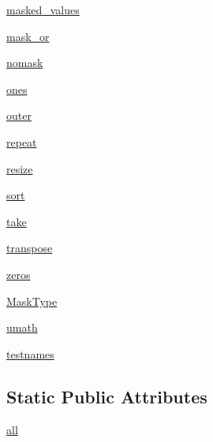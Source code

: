 \begin{DoxyCompactItemize}
\item 
\hyperlink{classnumpy_1_1ma_1_1timer__comparison_1_1ModuleTester_a4f987d88e7687d651a442ce0e7c1e769}{masked\+\_\+values}
\item 
\hyperlink{classnumpy_1_1ma_1_1timer__comparison_1_1ModuleTester_af5283af9a45a82144014f194888e8957}{mask\+\_\+or}
\item 
\hyperlink{classnumpy_1_1ma_1_1timer__comparison_1_1ModuleTester_a2b7f690879359afcf6de837aa901b72e}{nomask}
\item 
\hyperlink{classnumpy_1_1ma_1_1timer__comparison_1_1ModuleTester_a622733d2b2f6e512836eb9c3eac89f42}{ones}
\item 
\hyperlink{classnumpy_1_1ma_1_1timer__comparison_1_1ModuleTester_a6aa62dab2c3845828f077d7b8c1f2765}{outer}
\item 
\hyperlink{classnumpy_1_1ma_1_1timer__comparison_1_1ModuleTester_a0108f09789a18ca14b0f7514b2fb80de}{repeat}
\item 
\hyperlink{classnumpy_1_1ma_1_1timer__comparison_1_1ModuleTester_a03c0c59f58a8ee5dd213c69a9a3b18a1}{resize}
\item 
\hyperlink{classnumpy_1_1ma_1_1timer__comparison_1_1ModuleTester_a6ee8bba025acc3c8b8ef320d2bb4f79d}{sort}
\item 
\hyperlink{classnumpy_1_1ma_1_1timer__comparison_1_1ModuleTester_a7d12292621f134e9a77d4b626c0b6946}{take}
\item 
\hyperlink{classnumpy_1_1ma_1_1timer__comparison_1_1ModuleTester_af6ebaf394791294587b083d469bd7115}{transpose}
\item 
\hyperlink{classnumpy_1_1ma_1_1timer__comparison_1_1ModuleTester_ab3887e687dde074abd65df37bf1c5429}{zeros}
\item 
\hyperlink{classnumpy_1_1ma_1_1timer__comparison_1_1ModuleTester_a86d2e76c7731614088ff8b68c4ee71c5}{Mask\+Type}
\item 
\hyperlink{classnumpy_1_1ma_1_1timer__comparison_1_1ModuleTester_ae167290754796b6083b57affdbd2ad43}{umath}
\item 
\hyperlink{classnumpy_1_1ma_1_1timer__comparison_1_1ModuleTester_a0c42e0007f52f164d2c57b0f4f8c53e0}{testnames}
\end{DoxyCompactItemize}
\subsection*{Static Public Attributes}
\begin{DoxyCompactItemize}
\item 
\hyperlink{classnumpy_1_1ma_1_1timer__comparison_1_1ModuleTester_a15b8f5d539a11386a8a07a39e35f789c}{all}
\end{DoxyCompactItemize}


